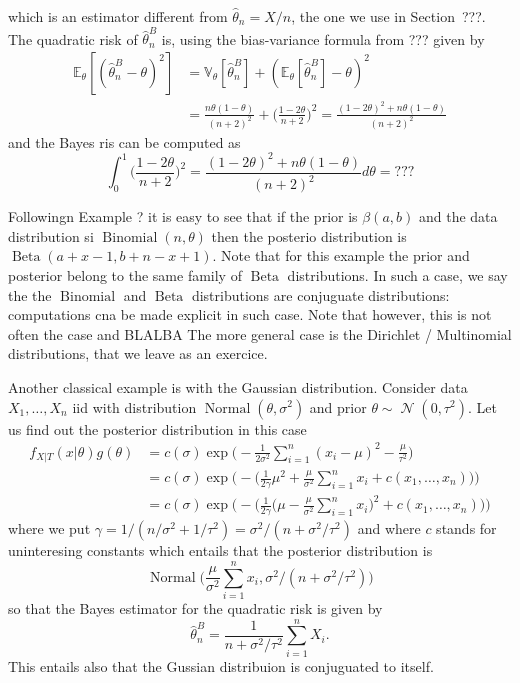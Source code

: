 \documentclass[
	fontsize=11pt, %
	twoside=false, %
	numbers=noenddot, %
]{kaobook}
\DeclareMathOperator{\cN}{{\mathcal N}}
\DeclareMathOperator{\bet}{Beta}
\DeclareMathOperator{\bin}{Binomial}
\DeclareMathOperator{\nor}{Normal}
\newcommand{\E}{\mathbb E}
\newcommand{\var}{\mathbb V}
\newcommand{\wh}{\widehat}
\begin{document}
which is an estimator different from $\wh \theta_n = X / n$, the one we use in Section~???.
The quadratic risk of $\wh \theta_n^B$ is, using the bias-variance formula from ??? given by
\begin{align*}
	\E_\theta[ (\wh \theta_n^B - \theta)^2] &= \var_\theta[\wh \theta_n^B] + (\E_\theta[\wh \theta_n^B] - \theta)^2 \\
	&= \frac{n \theta(1 - \theta)}{(n + 2)^2} + \Big( \frac{1 - 2 \theta}{n + 2} \Big)^2 = \frac{(1 - 2 \theta)^2 + n \theta (1 - \theta)}{(n+2)^2}
\end{align*}
and the Bayes ris can be computed as 
\begin{equation*}
	\int_0^1 \Big( \frac{1 - 2 \theta}{n + 2} \Big)^2 = \frac{(1 - 2 \theta)^2 + n \theta (1 - \theta)}{(n+2)^2} d \theta = ???
\end{equation*}


Followingn Example ? it is easy to see that if the prior is $\beta(a, b)$ and the data distribution
 si $\bin(n, \theta)$ then the posterio distribution is $\bet(a + x - 1, b + n - x + 1)$. Note that for this example the prior and posterior belong to the same family of $\bet$ distributions. In such a case, we say the the $\bin$ and $\bet$ distributions are conjuguate distributions: computations cna be made explicit in such case.
Note that however, this is not often the case and BLALBA
The more general case is the Dirichlet / Multinomial distributions, that we leave as an exercice.

Another classical example is with the Gaussian distribution.
Consider data $X_1, \ldots, X_n$ iid with distribution $\nor(\theta, \sigma^2)$ and prior $\theta \sim \cN(0, \tau^2)$.
Let us find out the posterior distribution in this case
\begin{align*}
	f_{X | T}(x | \theta) g(\theta) &= c(\sigma) \exp\Big( - \frac{1}{2 \sigma^2} \sum_{i=1}^n (x_i - \mu)^2 - \frac{\mu}{\tau^2} \Big) \\
	&= c(\sigma) \exp \Big (  -\Big( \frac{1}{2 \gamma} \mu^2 + \frac{\mu}{\sigma^2} \sum_{i=1}^n x_i + c(x_1, \ldots, x_n) \Big)  \Big ) \\
	&= c(\sigma) \exp \Big( -\Big( \frac{1}{2 \gamma} \Big( \mu -  \frac{\mu}{\sigma^2} \sum_{i=1}^n x_i 
	\Big)^2 + c(x_1, \ldots, x_n) \Big)  \Big )
\end{align*}
where we put $\gamma = 1 / (n / \sigma^2 + 1 / \tau^2) = \sigma^2 / (n + \sigma^2 / \tau^2)$ and where $c$ stands for uninteresing constants which entails that the posterior distribution is
\begin{equation*}
	\nor\Big( \frac{\mu}{\sigma^2} \sum_{i=1}^n x_i, \sigma^2 / (n + \sigma^2 / \tau^2) \Big)
\end{equation*}
so that the Bayes estimator for the quadratic risk is given by 
\begin{equation*}
	\wh \theta_n^B = \frac{1}{n + \sigma^2 / \tau^2} \sum_{i=1}^n X_i.
\end{equation*}
This entails also that the Gussian distribuion is conjuguated to itself.
\end{document}
